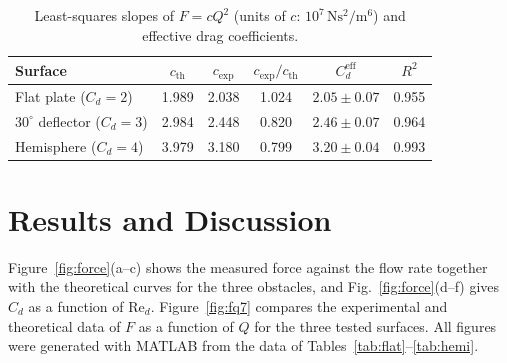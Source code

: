 \documentclass[11pt,a4paper]{article}
\numberwithin{equation}{section}
\newcommand{\Cd}{C_d}
\newcommand{\Red}{\mathrm{Re}_d}
\begin{document}
\begin{table}[htbp]
\centering
\small
\caption{Least-squares slopes of $F=cQ^2$ (units of $c$: $10^{7}\,\si{\newton\second\squared\per\metre\tothe{6}}$) and effective drag coefficients.}
\label{tab:fit}
\begin{tabular}{l c c c c c}
\toprule
Surface & $c_{\mathrm{th}}$ & $c_{\exp}$ & $c_{\exp}/c_{\mathrm{th}}$ & $\Cd^{\mathrm{eff}}$ & $R^2$ \\
\midrule
Flat plate ($\Cd=2$) & 1.989 & 2.038 & 1.024 & $2.05\pm0.07$ & 0.955 \\
$30^\circ$ deflector ($\Cd=3$) & 2.984 & 2.448 & 0.820 & $2.46\pm0.07$ & 0.964 \\
Hemisphere ($\Cd=4$) & 3.979 & 3.180 & 0.799 & $3.20\pm0.04$ & 0.993 \\
\bottomrule
\end{tabular}
\end{table}

\section{Results and Discussion}
 
Figure~\ref{fig:force}(a--c) shows the measured force against the flow rate together with the theoretical curves for the three obstacles, and Fig.~\ref{fig:force}(d--f) gives $\Cd$ as a function of $\Red$. Figure~\ref{fig:fq7} compares the experimental and theoretical data of $F$ as a function of $Q$ for the three tested surfaces. All figures were generated with MATLAB from the data of Tables~\ref{tab:flat}--\ref{tab:hemi}.
 
\end{document}
